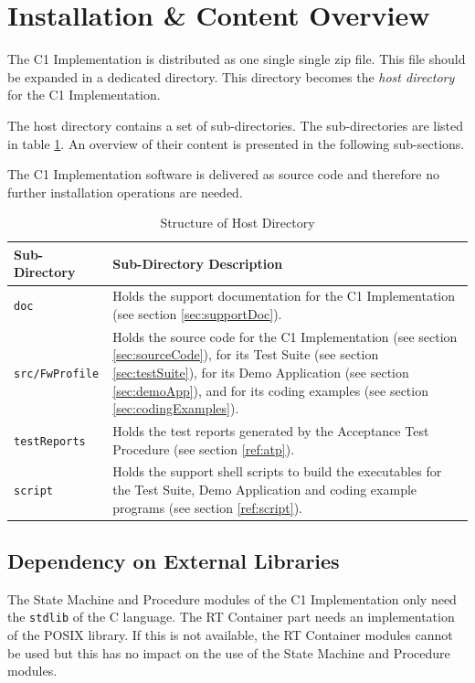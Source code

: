 \documentclass[a4paper,10pt]{article}
\let\stdsection\section
\renewcommand\section{\newpage\stdsection}
\begin{document}
\section{Installation \& Content Overview}
The C1 Implementation is distributed as one single single zip file. This file should be expanded in a dedicated directory. This directory becomes the \emph{host directory} for the C1 Implementation.

The host directory contains a set of sub-directories. The sub-directories are listed in table \ref{tab:hostdir}. An overview of their content is presented in the following sub-sections. 

The C1 Implementation software is delivered as source code and therefore no further 
installation operations are needed.

\begin{longtable}{|l|p{8.7cm}|}
\caption{Structure of Host Directory}\label{tab:hostdir} \\
\hline
\rowcolor{gray}
\textbf{Sub-Directory} & \textbf{Sub-Directory Description}\\
\hline\hline
\texttt{doc} & Holds the support documentation for the C1 Implementation (see section \ref{sec:supportDoc}).\\
\hline
\texttt{src/FwProfile} & Holds the source code for the C1 Implementation (see section \ref{sec:sourceCode}), for its Test Suite (see section \ref{sec:testSuite}), for its Demo Application (see section \ref{sec:demoApp}), and for its coding examples (see section \ref{sec:codingExamples}).\\
\hline
\texttt{testReports} & Holds the test reports generated by the Acceptance Test Procedure (see section \ref{ref:atp}).\\
\hline
\texttt{script} & Holds the support shell scripts to build the executables for the Test Suite, Demo Application and coding example programs (see section \ref{ref:script}).\\
\hline
\end{longtable}

\subsection{Dependency on External Libraries}\label{sec:DepExtLib}
The State Machine and Procedure modules of the C1 Implementation only need the \texttt{stdlib} of the C language. The RT Container part needs an implementation of the POSIX library. If this is not available, the RT Container modules cannot be used but this has no impact on the use of the State Machine and Procedure modules.
\end{document}
